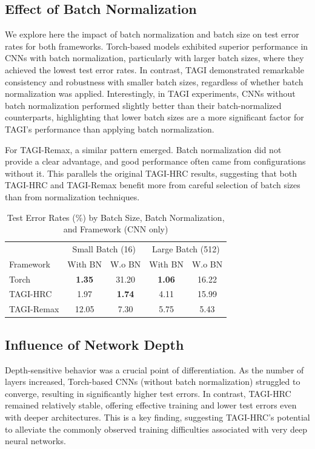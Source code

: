 \documentclass{article}
\begin{document}
\subsection{Effect of Batch Normalization}
We explore here the impact of batch normalization and batch size on test error rates for both frameworks. Torch-based models exhibited superior performance in CNNs with batch normalization, particularly with larger batch sizes, where they achieved the lowest test error rates. In contrast, TAGI demonstrated remarkable consistency and robustness with smaller batch sizes, regardless of whether batch normalization was applied. Interestingly, in TAGI experiments, CNNs without batch normalization performed slightly better than their batch-normalized counterparts, highlighting that lower batch sizes are a more significant factor for TAGI's performance than applying batch normalization.

For TAGI-Remax, a similar pattern emerged. Batch normalization did not provide a clear advantage, and good performance often came from configurations without it. This parallels the original TAGI-HRC results, suggesting that both TAGI-HRC and TAGI-Remax benefit more from careful selection of batch sizes than from normalization techniques.

\begin{table}[h]
\centering
\caption{Test Error Rates (\%) by Batch Size, Batch Normalization, and Framework (CNN only)}
\label{tab:batch_norm_batch_size_impact}
\begin{small}
\begin{tabular}{lcccc}
\toprule
 & \multicolumn{2}{c}{Small Batch (16)} & \multicolumn{2}{c}{Large Batch (512)} \\
Framework & With BN & W.o BN & With BN & W.o BN \\
\midrule
Torch      & \textbf{1.35} & 31.20 & \textbf{1.06} & 16.22 \\
TAGI-HRC   &  1.97         & \textbf{1.74} & 4.11 & 15.99 \\
TAGI-Remax & 12.05         &  7.30         & 5.75 &  5.43 \\
\bottomrule
\end{tabular}
\end{small}
\end{table}


\subsection{Influence of Network Depth}
Depth-sensitive behavior was a crucial point of differentiation. As the number of layers increased, Torch-based CNNs (without batch normalization) struggled to converge, resulting in significantly higher test errors. In contrast, TAGI-HRC remained relatively stable, offering effective training and lower test errors even with deeper architectures. This is a key finding, suggesting TAGI-HRC’s potential to alleviate the commonly observed training difficulties associated with very deep neural networks.
\end{document}
